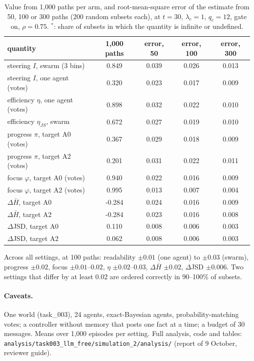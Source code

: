 \documentclass[10pt,a4paper]{article}
\begin{document}
\begin{table}[H]
\centering\small
\caption{Value from 1{,}000 paths per arm, and root-mean-square error of the estimate from 50, 100
or 300 paths (200 random subsets each), at $t = 30$, $\lambda_c = 1$, $q_c = 12$, gate on, $\rho = 0.75$. $^\ast$: share of subsets in which
the quantity is infinite or undefined.}
\label{tab:effprec}
\begin{tabular}{lcccc}
\toprule
quantity & 1{,}000 paths & error, 50 & error, 100 & error, 300 \\
\midrule
steering $I$, swarm (3 bins) & 0.849 & 0.039 & 0.026 & 0.013 \\
steering $I$, one agent (votes) & 0.320 & 0.023 & 0.017 & 0.009 \\
efficiency $\eta$, one agent (votes) & 0.898 & 0.032 & 0.022 & 0.010 \\
efficiency $\eta_{JS}$, swarm & 0.672 & 0.027 & 0.019 & 0.010 \\
progress $\pi$, target A0 (votes) & 0.367 & 0.029 & 0.018 & 0.009 \\
progress $\pi$, target A2 (votes) & 0.201 & 0.031 & 0.022 & 0.011 \\
focus $\varphi$, target A0 (votes) & 0.940 & 0.022 & 0.016 & 0.009 \\
focus $\varphi$, target A2 (votes) & 0.995 & 0.013 & 0.007 & 0.004 \\
$\Delta\bar H$, target A0 & -0.284 & 0.024 & 0.016 & 0.009 \\
$\Delta\bar H$, target A2 & -0.284 & 0.023 & 0.016 & 0.008 \\
$\Delta$JSD, target A0 & 0.110 & 0.008 & 0.006 & 0.003 \\
$\Delta$JSD, target A2 & 0.062 & 0.008 & 0.006 & 0.003 \\
\bottomrule
\end{tabular}
\end{table}

\noindent Across all settings, at 100 paths: readability $\pm0.01$ (one agent) to $\pm0.03$ (swarm),
progress $\pm0.02$, focus $\pm0.01$--$0.02$, $\eta$ $\pm0.02$--$0.03$, $\Delta\bar H$ $\pm0.02$, $\Delta$JSD
$\pm0.006$. Two settings that differ by at least 0.02 are ordered correctly in 90--100\% of subsets.

\paragraph{Caveats.} One world (task\_003), 24 agents, exact-Bayesian agents,
probability-matching votes; a controller without memory that posts one fact at a time; a
budget of 30 messages. Means over 1{,}000 episodes per setting. Full analysis, code and
tables: \texttt{analysis/task003\_llm\_free/simulation\_2/analysis/} (report of 9 October,
reviewer guide).
\end{document}
